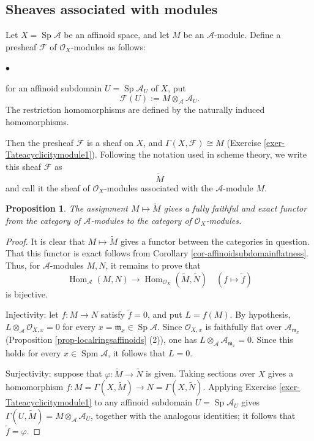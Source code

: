 \documentclass[a4paper,12pt, dvipdfmx]{jsbook}
\def\O{\mathscr{O}}
\def\m{\mathfrak{m}}
\def\til#1{\widetilde{#1}}%
\def\Spm{\mathop{\mathrm{Spm}}\nolimits}
\def\Sp{\mathop{\mathrm{Sp}}\nolimits}
\def\Hom{\mathop{\mathrm{Hom}}\nolimits}
\renewenvironment{itemize}%
{%
   \begin{list}{\parbox{1zw}{$\bullet$}}%
   {%
      \setlength{\topsep}{.5zh}
      \setlength{\itemindent}{0zw}
      \setlength{\leftmargin}{3zw}%
      \setlength{\rightmargin}{0zw}%
      \setlength{\labelsep}{.5zw}%
      \setlength{\labelwidth}{3zw}%
      \setlength{\itemsep}{0.2em}%
      \setlength{\parsep}{0em}%
      \setlength{\listparindent}{0zw}%
   }
}{%
   \end{list}%
}
\theoremstyle{plain}
\newtheorem{prop}[thm]{\bfseries Proposition}
\theoremstyle{definition}
\begin{document}
\subsection{Sheaves associated with modules}\label{sub-sheaftildaconstruction}
Let $X=\Sp\mathcal{A}$ be an affinoid space, and let $M$ be an $\mathcal{A}$-module.
Define a presheaf $\mathscr{F}$ of $\O_X$-modules as follows:
\begin{itemize}
\item for an affinoid subdomain $U=\Sp\mathcal{A}_U$ of $X$, put
$$
\mathscr{F}(U):=M\otimes_{\mathcal{A}}\mathcal{A}_U.
$$
The restriction homomorphisms are defined by the naturally induced homomorphisms.
\end{itemize}
Then the presheaf $\mathscr{F}$ is a sheaf on $X$, and $\Gamma(X,\mathscr{F})\cong M$ (Exercise \ref{exer-Tateacyclicitymodule1}).
Following the notation used in scheme theory, we write this sheaf $\mathscr{F}$ as
$$
\til{M}
$$
and call it the sheaf of $\O_X$-modules associated with the $\mathcal{A}$-module $M$.
\begin{prop}\label{prop-sheaftildaconstruction}{\rm 
The assignment $M\mapsto\til{M}$ gives a fully faithful and exact functor from the category of $\mathcal{A}$-modules to the category of $\O_X$-modules.}
\end{prop}

\begin{proof}[Proof]
It is clear that $M\mapsto\til{M}$ gives a functor between the categories in question.
That this functor is exact follows from Corollary \ref{cor-affinoidsubdomainflatness}.
Thus, for $\mathcal{A}$-modules $M,N$, it remains to prove that
$$
\Hom_{\mathcal{A}}(M,N)\longrightarrow\Hom_{\O_X}(\til{M},\til{N})\quad(f\longmapsto\til{f})
$$
is bijective.

Injectivity: let $f\colon M\rightarrow N$ satisfy $\til{f}=0$, and put $L=f(M)$.
By hypothesis, $L\otimes_{\mathcal{A}}\O_{X,x}=0$ for every $x=\m_x\in\Sp\mathcal{A}$.
Since $\O_{X,x}$ is faithfully flat over $\mathcal{A}_{\m_x}$ (Proposition \ref{prop-localringsaffinoids} (2)), one has $L\otimes_{\mathcal{A}}\mathcal{A}_{\m_x}=0$.
Since this holds for every $x\in\Spm\mathcal{A}$, it follows that $L=0$.

Surjectivity: suppose that $\varphi\colon\til{M}\rightarrow\til{N}$ is given.
Taking sections over $X$ gives a homomorphism $f\colon M=\Gamma(X,\til{M})\rightarrow N=\Gamma(X,\til{N})$.
Applying Exercise \ref{exer-Tateacyclicitymodule1} to any affinoid subdomain $U=\Sp\mathcal{A}_U$ gives $\Gamma(U,\til{M})=M\otimes_{\mathcal{A}}\mathcal{A}_U$, together with the analogous identities; it follows that $\til{f}=\varphi$.
\end{proof}
\end{document}

